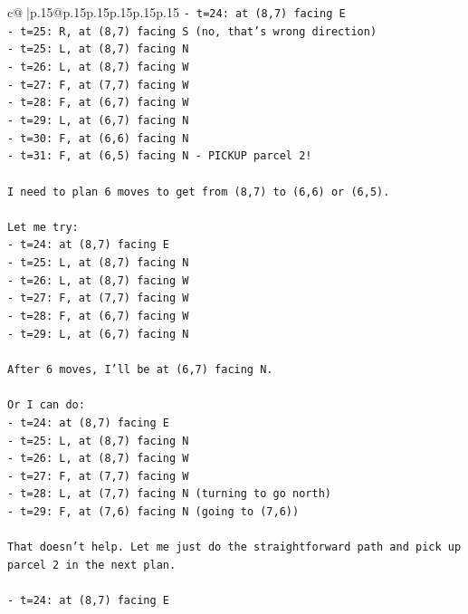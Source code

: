 \documentclass{article}
\begin{document}
{\begin{supertabular}{c@{$\;$}|p{.15\linewidth}@{}p{.15\linewidth}p{.15\linewidth}p{.15\linewidth}p{.15\linewidth}p{.15\linewidth}}
{{{\texttt{{-} t=24: at (8,7) facing E} \\
\texttt{{-} t=25: R, at (8,7) facing S (no, that's wrong direction)} \\
\texttt{{-} t=25: L, at (8,7) facing N} \\
\texttt{{-} t=26: L, at (8,7) facing W} \\
\texttt{{-} t=27: F, at (7,7) facing W} \\
\texttt{{-} t=28: F, at (6,7) facing W} \\
\texttt{{-} t=29: L, at (6,7) facing N} \\
\texttt{{-} t=30: F, at (6,6) facing N} \\
\texttt{{-} t=31: F, at (6,5) facing N {-} PICKUP parcel 2!} \\
\\ 
\texttt{I need to plan 6 moves to get from (8,7) to (6,6) or (6,5).} \\
\\ 
\texttt{Let me try:} \\
\texttt{{-} t=24: at (8,7) facing E} \\
\texttt{{-} t=25: L, at (8,7) facing N} \\
\texttt{{-} t=26: L, at (8,7) facing W} \\
\texttt{{-} t=27: F, at (7,7) facing W} \\
\texttt{{-} t=28: F, at (6,7) facing W} \\
\texttt{{-} t=29: L, at (6,7) facing N} \\
\\ 
\texttt{After 6 moves, I'll be at (6,7) facing N.} \\
\\ 
\texttt{Or I can do:} \\
\texttt{{-} t=24: at (8,7) facing E} \\
\texttt{{-} t=25: L, at (8,7) facing N} \\
\texttt{{-} t=26: L, at (8,7) facing W} \\
\texttt{{-} t=27: F, at (7,7) facing W} \\
\texttt{{-} t=28: L, at (7,7) facing N (turning to go north)} \\
\texttt{{-} t=29: F, at (7,6) facing N (going to (7,6))} \\
\\ 
\texttt{That doesn't help. Let me just do the straightforward path and pick up parcel 2 in the next plan.} \\
\\ 
\texttt{{-} t=24: at (8,7) facing E} \\
}}}
\end{supertabular}}
\end{document}
